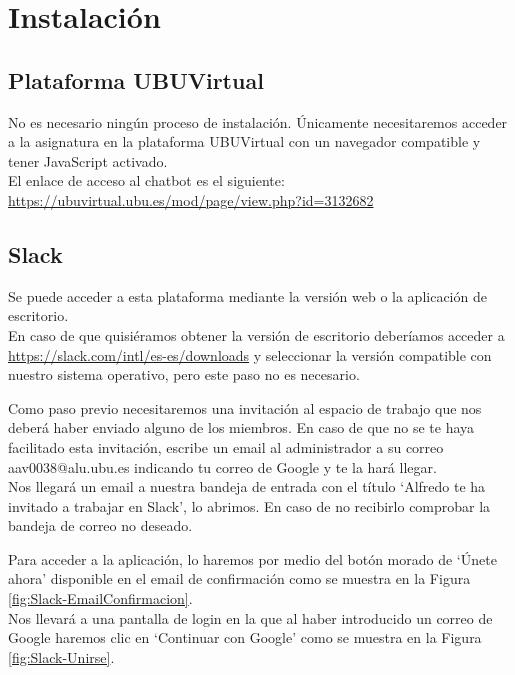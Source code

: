  \newpage
\section{Instalación}

\subsection{Plataforma UBUVirtual}

No es necesario ningún proceso de instalación. Únicamente necesitaremos acceder a la asignatura en la plataforma UBUVirtual con un navegador compatible y tener JavaScript activado.\\

El enlace de acceso al chatbot es el siguiente: \url{https://ubuvirtual.ubu.es/mod/page/view.php?id=3132682}

\subsection{Slack}

Se puede acceder a esta plataforma mediante la versión web o la aplicación de escritorio.\\
En caso de que quisiéramos obtener la versión de escritorio deberíamos acceder a \url{https://slack.com/intl/es-es/downloads} y seleccionar la versión compatible con nuestro sistema operativo, pero este paso no es necesario.

Como paso previo necesitaremos una invitación al espacio de trabajo que nos deberá haber enviado alguno de los miembros. En caso de que no se te haya facilitado esta invitación, escribe un email al administrador a su correo  aav0038@alu.ubu.es indicando tu correo de Google y te la hará llegar. \\

Nos llegará un email a nuestra bandeja de entrada con el título `Alfredo te ha invitado a trabajar en Slack', lo abrimos. En caso de no recibirlo comprobar la bandeja de correo no deseado. 


Para acceder a la aplicación, lo haremos por medio del botón morado de `Únete ahora' disponible en el email de confirmación como se muestra en la Figura \ref{fig:Slack-EmailConfirmacion}. \\
Nos llevará a una pantalla de login en la que al haber introducido un correo de Google haremos clic en `Continuar con Google' como se muestra en la Figura \ref{fig:Slack-Unirse}.

